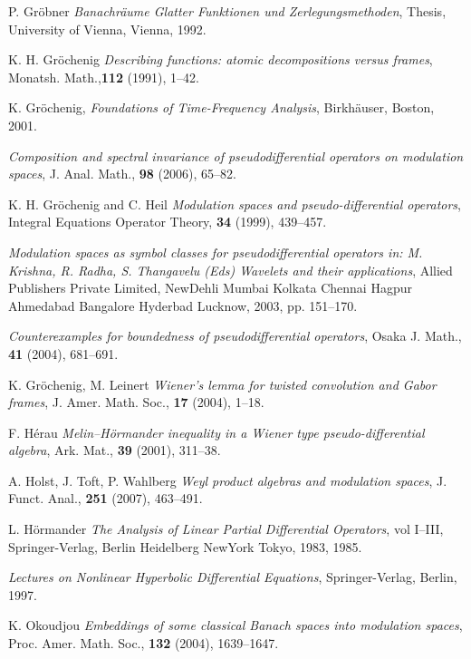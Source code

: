 \documentclass[12pt,a4paper,reqno]{amsart}
\numberwithin{equation}{section}
\numberwithin{thm}{section}
\theoremstyle{definition}
\theoremstyle{remark}
\begin{document}
\begin{thebibliography}{150}
 P. Gr{\"o}bner \emph{Banachr{\"a}ume Glatter
Funktionen und Zerlegungsmethoden}, Thesis, University of Vienna,
Vienna, 1992.

 {K. H. Gr{\"o}chenig} \emph {Describing
functions: atomic decompositions versus frames},
{Monatsh. Math.},\textbf{112} (1991), 1--42.

 K. Gr\"{o}chenig, \newblock \textit{Foundations of
Time-Frequency Analysis},
\newblock Birkh\"auser, Boston, 2001.

 \bysame \emph{Composition and spectral invariance
of pseudodifferential operators on modulation spaces}, J. Anal.
Math., \textbf{98} (2006), 65--82.

  {K. H. Gr{\"o}chenig and C. Heil} \emph
{Modulation spaces and pseudo-differential operators}, Integral
Equations Operator Theory, \textbf{34} (1999), 439--457.

  \bysame \emph {Modulation spaces as symbol
classes for pseudodifferential operators {\rm {in: M. Krishna,
R. Radha, S. Thangavelu (Eds) Wavelets and their applications}}},
Allied Publishers Private Limited, NewDehli Mumbai Kolkata Chennai
Hagpur Ahmedabad Bangalore Hyderbad Lucknow, 2003, pp. 151--170.

 \bysame \emph{Counterexamples for boundedness of
pseudodifferential operators}, Osaka  J. Math., \textbf{41} (2004),
681--691.

 K. Gr{\"o}chenig, M. Leinert \emph{Wiener's lemma
for twisted convolution and Gabor frames}, J. Amer. Math. Soc.,
\textbf{17} (2004), 1--18.

 F. H{\' e}rau \emph{Melin--H{\"o}rmander inequality
in a Wiener type pseudo-differential algebra}, Ark. Mat., \textbf{39}
(2001), 311--38.

 A. Holst, J. Toft, P. Wahlberg \emph{Weyl product
algebras and modulation spaces}, {J. Funct. Anal.}, \textbf{251}
(2007), 463--491.

  L. H{\"o}rmander \emph{The Analysis of Linear
Partial Differential Operators}, vol {I--III},
Springer-Verlag, Berlin Heidelberg NewYork Tokyo, 1983, 1985.

 \bysame \emph{Lectures on Nonlinear Hyperbolic
Differential Equations}, Springer-Verlag, Berlin, 1997.

 K. Okoudjou \emph{Embeddings of some classical
Banach spaces into modulation spaces}, {Proc. Amer. Math. Soc.},
\textbf{132} (2004), 1639--1647.


\end{thebibliography}
\end{document}
